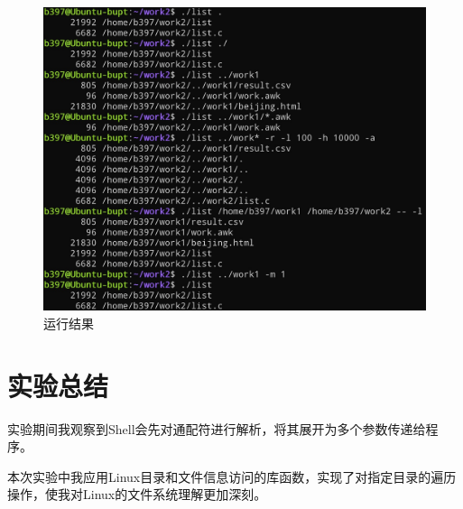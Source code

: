 \documentclass[lang=cn,11pt,a4paper,cite=authornum]{paper}
\begin{document}
\begin{figure}[!htb]
    \centering
    \includegraphics[width=\textwidth]{./images/l2.jpg}
    \caption{运行结果\label{fig:p1}}
\end{figure}

\section{实验总结}

实验期间我观察到Shell会先对通配符进行解析，将其展开为多个参数传递给程序。

本次实验中我应用Linux目录和文件信息访问的库函数，实现了对指定目录的遍历操作，使我对Linux的文件系统理解更加深刻。
\end{document}
